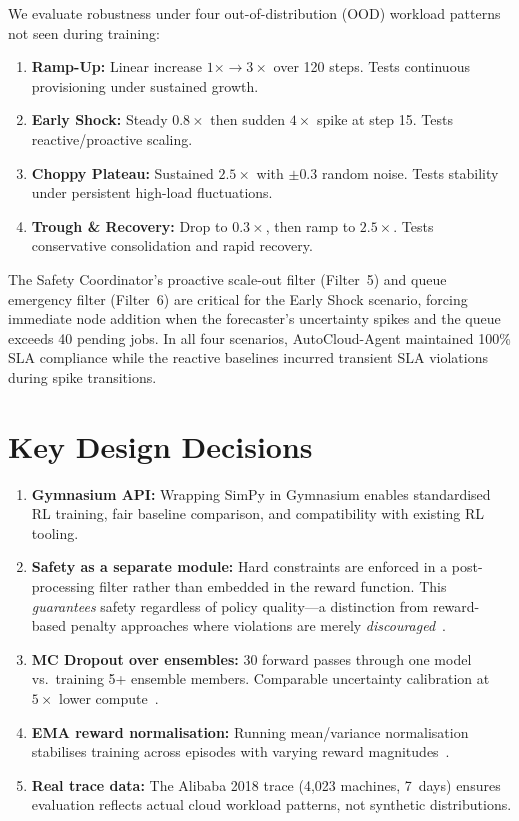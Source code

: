 \documentclass[conference]{IEEEtran}
\begin{document}
We evaluate robustness under four out-of-distribution (OOD) workload patterns
not seen during training:
\begin{enumerate}
  \item \textbf{Ramp-Up:} Linear increase $1\times \rightarrow 3\times$ over
        120 steps.  Tests continuous provisioning under sustained growth.
  \item \textbf{Early Shock:} Steady $0.8\times$ then sudden $4\times$ spike at
        step 15.  Tests reactive/proactive scaling.
  \item \textbf{Choppy Plateau:} Sustained $2.5\times$ with $\pm 0.3$ random
        noise.  Tests stability under persistent high-load fluctuations.
  \item \textbf{Trough \& Recovery:} Drop to $0.3\times$, then ramp to
        $2.5\times$.  Tests conservative consolidation and rapid recovery.
\end{enumerate}

The Safety Coordinator's proactive scale-out filter (Filter~5) and queue
emergency filter (Filter~6) are critical for the Early Shock scenario,
forcing immediate node addition when the forecaster's uncertainty spikes
and the queue exceeds 40 pending jobs.  In all four scenarios, AutoCloud-Agent
maintained 100\% SLA compliance while the reactive baselines incurred transient
SLA violations during spike transitions.

\section{Key Design Decisions}

\begin{enumerate}
  \item \textbf{Gymnasium API:} Wrapping SimPy in Gymnasium enables standardised
        RL training, fair baseline comparison, and compatibility with existing
        RL tooling.
  \item \textbf{Safety as a separate module:} Hard constraints are enforced in
        a post-processing filter rather than embedded in the reward function.
        This \emph{guarantees} safety regardless of policy quality---a
        distinction from reward-based penalty approaches where violations are
        merely \emph{discouraged}~\cite{amodei2016concrete}.
  \item \textbf{MC Dropout over ensembles:} 30 forward passes through one model
        vs.\ training 5+ ensemble members.  Comparable uncertainty calibration
        at $5\times$ lower compute~\cite{gal2016dropout}.
  \item \textbf{EMA reward normalisation:} Running mean/variance normalisation
        stabilises training across episodes with varying reward
        magnitudes~\cite{welford1962note}.
  \item \textbf{Real trace data:} The Alibaba 2018 trace (4,023 machines,
        7~days) ensures evaluation reflects actual cloud workload patterns,
        not synthetic distributions.
\end{enumerate}
\end{document}
